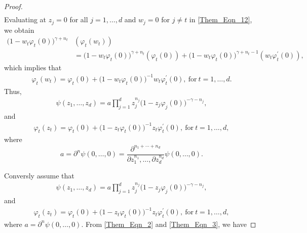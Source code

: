 \documentclass[12pt, reqno]{amsart}
\theoremstyle{definition}
\theoremstyle{remark}
\numberwithin{equation}{section}
\begin{document}
\begin{proof}
\begin{align}
  	  \end{align}
  	  Evaluating at $z_j=0$ for all $j=1, \dots, d$ and $w_j=0$ for $j\neq t$ in \eqref{Them_Eqn_12}, we obtain 
  	  \begin{align}\label{Them_Eqn_13}
  	  	\big(1-w_t\varphi_t(0)\big)^{\gamma+n_t}&(\varphi_t(w_t))\nonumber\\
  	  	&=	\big(1-w_t\varphi_t(0)\big)^{\gamma+n_t}(\varphi_t(0))+\big(1-w_t\varphi_t(0)\big)^{\gamma+n_t-1}(w_t\varphi_t^{\prime}(0)),
  	  \end{align} 
  	  which implies that 
  	  \begin{gather*}
  	  \varphi_t(w_t)=\varphi_t(0)+\big(1-w_t\varphi_t(0)\big)^{-1}w_t\varphi_t^{\prime}(0),~ \mbox{for}~ t=1, \dots, d.
  	  \end{gather*}
  	  Thus,
  	  \begin{gather*}
  	  \psi(z_1, \dots, z_d)=a\prod_{j=1}^dz_j^{n_j}\big(1-z_j\varphi_j(0)\big)^{-\gamma-n_j},
  	  \end{gather*}
  	  and 
  	  \begin{gather*}
  	  \varphi_t(z_t)=\varphi_t(0)+\big(1-z_t\varphi_t(0)\big)^{-1}z_t\varphi_t^{\prime}(0),~ \mbox{for}~ t=1, \dots, d,
  	  \end{gather*}
  	  where $$a=\partial^n\psi(0, \dots, 0)=\frac{\partial^{n_1+\cdots+n_d}}{\partial z_1^{n_1},\dots, \partial z_d^{n_d}}\psi(0, \dots, 0).$$
  	  
  	  Conversly assume that 
  	  \begin{gather*}
  	  \psi(z_1, \dots, z_d)=a\prod_{j=1}^dz_j^{n_j}\big(1-z_j\varphi_j(0)\big)^{-\gamma-n_j},
  	  \end{gather*}
  	  and 
  	  \begin{gather*}
  	  \varphi_t(z_t)=\varphi_t(0)+\big(1-z_t\varphi_t(0)\big)^{-1}z_t\varphi_t^{\prime}(0),~ \mbox{for}~ t=1, \dots, d,
  	  \end{gather*}
  	  where $a=\partial^n\psi(0, \dots, 0)$.
  	  From \eqref{Them_Eqn_2} and \eqref{Them_Eqn_3}, we have  
  	  

\end{proof}
\end{document}
